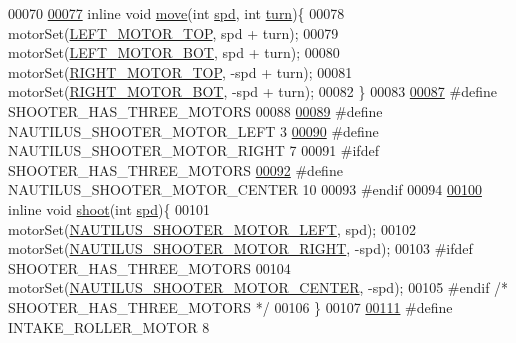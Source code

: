 \begin{DoxyCode}
00070 
\hypertarget{motors_8h_source.tex_l00077}{}\hyperlink{motors_8h_ae918d6900bfd9ad920597db4f3ff138f}{00077} \textcolor{keyword}{inline} \textcolor{keywordtype}{void} \hyperlink{motors_8h_ae918d6900bfd9ad920597db4f3ff138f}{move}(\textcolor{keywordtype}{int} \hyperlink{opcontrol_8c_a642ce334330c8b0f6e33dd0a3fa65111}{spd}, \textcolor{keywordtype}{int} \hyperlink{opcontrol_8c_aaefa47f4fdf865c2358c22b542a993e4}{turn})\{
00078     motorSet(\hyperlink{motors_8h_a3e06fbce97caed16e0a0f27f544587af}{LEFT\_MOTOR\_TOP}, spd + turn);
00079     motorSet(\hyperlink{motors_8h_a43691a92e03fa5319b14f01193f47b9a}{LEFT\_MOTOR\_BOT}, spd + turn);
00080     motorSet(\hyperlink{motors_8h_a306c5923dd0328c4bfc09255de9d124c}{RIGHT\_MOTOR\_TOP}, -spd + turn);
00081     motorSet(\hyperlink{motors_8h_a85c904d091f71ba7fc53a446524b6c61}{RIGHT\_MOTOR\_BOT}, -spd + turn);
00082 \}
00083 
\hypertarget{motors_8h_source.tex_l00087}{}\hyperlink{motors_8h_a7f78a80833903fca930b13a1f2ab6bd5}{00087} \textcolor{preprocessor}{#define SHOOTER\_HAS\_THREE\_MOTORS}
00088 
\hypertarget{motors_8h_source.tex_l00089}{}\hyperlink{motors_8h_a4a9fed3366effbbb942b907c131ae8bd}{00089} \textcolor{preprocessor}{#define NAUTILUS\_SHOOTER\_MOTOR\_LEFT 3}
\hypertarget{motors_8h_source.tex_l00090}{}\hyperlink{motors_8h_a3fa3054b1d74b733800c7b9252362334}{00090} \textcolor{preprocessor}{#define NAUTILUS\_SHOOTER\_MOTOR\_RIGHT 7}
00091 \textcolor{preprocessor}{#ifdef SHOOTER\_HAS\_THREE\_MOTORS}
\hypertarget{motors_8h_source.tex_l00092}{}\hyperlink{motors_8h_a681ecbcdbf9007fc5ccf3d67cdcfb505}{00092} \textcolor{preprocessor}{#define NAUTILUS\_SHOOTER\_MOTOR\_CENTER 10}
00093 \textcolor{preprocessor}{#endif}
00094 
\hypertarget{motors_8h_source.tex_l00100}{}\hyperlink{motors_8h_ab183a9a4e6e469515b9f283f7156f843}{00100} \textcolor{keyword}{inline} \textcolor{keywordtype}{void} \hyperlink{motors_8h_ab183a9a4e6e469515b9f283f7156f843}{shoot}(\textcolor{keywordtype}{int} \hyperlink{opcontrol_8c_a642ce334330c8b0f6e33dd0a3fa65111}{spd})\{
00101     motorSet(\hyperlink{motors_8h_a4a9fed3366effbbb942b907c131ae8bd}{NAUTILUS\_SHOOTER\_MOTOR\_LEFT}, spd);
00102     motorSet(\hyperlink{motors_8h_a3fa3054b1d74b733800c7b9252362334}{NAUTILUS\_SHOOTER\_MOTOR\_RIGHT}, -spd);
00103 \textcolor{preprocessor}{#ifdef SHOOTER\_HAS\_THREE\_MOTORS}
00104     motorSet(\hyperlink{motors_8h_a681ecbcdbf9007fc5ccf3d67cdcfb505}{NAUTILUS\_SHOOTER\_MOTOR\_CENTER}, -spd);
00105 \textcolor{preprocessor}{#endif }\textcolor{comment}{/* SHOOTER\_HAS\_THREE\_MOTORS */}\textcolor{preprocessor}{}
00106 \}
00107 
\hypertarget{motors_8h_source.tex_l00111}{}\hyperlink{motors_8h_a8ac783dc4e09804d3b2f7e3b6bbecad7}{00111} \textcolor{preprocessor}{#define INTAKE\_ROLLER\_MOTOR 8}

\end{DoxyCode}
